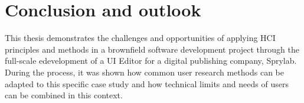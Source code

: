 %
\chapter{Conclusion and outlook}
\label{chap:conclusion}      
This thesis demonstrates the challenges and opportunities of applying HCI principles and methods in a brownfield software development project through the full-scale edevelopment of a UI Editor for a digital publishing company, Sprylab.
During the process, it was shown how common user research methods can be adapted to this specific case study and how technical limits and needs of users can be combined in this context.

